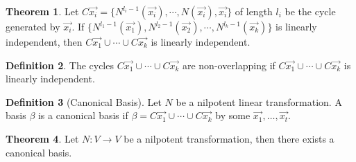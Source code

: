 \documentclass{article}
\theoremstyle{definition}
\newtheorem{theorem}{Theorem}[section]
\newtheorem{definition}[theorem]{Definition}
\theoremstyle{remark}
\begin{document}
\begin{theorem}
    Let $C\vec{x_i}=\{N^{l_i-1}(\vec{x_i}),\cdots,N(\vec{x_i}),\vec{x_i}\}$ of length $l_i$ be the cycle generated by $\vec{x_i}$.
    If $\{N^{l_1-1}(\vec{x_1}),N^{l_2-1}(\vec{x_2}),\cdots, N^{l_k-1}(\vec{x_k})\}$ is linearly independent, then $C\vec{x_1}\cup\cdots\cup C\vec{x_k}$ is linearly independent.
\end{theorem}

\begin{definition}
    The cycles $C\vec{x_1}\cup\cdots\cup C\vec{x_k}$ are non-overlapping if $C\vec{x_1}\cup\cdots\cup C\vec{x_k}$ is linearly independent.
\end{definition}

\begin{definition}[Canonical Basis]
    Let $N$ be a nilpotent linear transformation. A basis $\beta$ is a canonical basis if $\beta=C\vec{x_1}\cup \cdots\cup C\vec{x_k}$ by some $\vec{x_1},\dots,\vec{x_t}$.
\end{definition}

\begin{theorem}
    Let $N:V\rightarrow V$ be a nilpotent transformation, then there exists a canonical basis.
\end{theorem}
\end{document}
